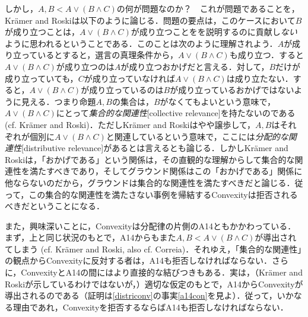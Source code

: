 \documentclass[twoside,14Q,uplatex,dvipdfmx]{jsarticle}
\theoremstyle{definition}
\begin{document}
しかし，$A, B<A\lor(B\land C)$の何が問題なのか？　これが問題であることを，Kr\"{a}mer and Roski\cite{KramerandRoski2015}は以下のように論じる．問題の要点は，このケースにおいて$B$が成り立つことは，$A\lor(B\land C)$が成り立つことをを説明するのに貢献し\emph{ない}ように思われるということである．このことは次のように理解されよう．$A$が成り立っているとすると，選言の真理条件から，$A\lor(B\land C)$も成り立つ．すると$A\lor(B\land C)$が成り立つのは$A$が成り立つおかげだと言える．対して，$B$だけが成り立っていても，$C$が成り立っていなければ$A\lor(B\land C)$は成り立たない．すると，$A\lor(B\land C)$が成り立っているのは$B$が成り立っているおかげではないように見える．つまり命題$A, B$の集合は，$B$がなくてもよいという意味で，$A\lor(B\land C)$にとって\emph{集合的な関連性}[collective relevance]を持たないのである (cf. Kr\"{a}mer and Roski\cite[p.65]{KramerandRoski2015})．ただしKr\"{a}mer and Roskiはやや譲歩して，$A, B$はそれぞれが個別に$A\lor(B\land C)$と関連しているという意味で，ここには\emph{分配的な関連性}[distributive relevance]があるとは言えるとも論じる．しかしKr\"{a}mer and Roskiは，「おかげである」という関係は，その直観的な理解からして集合的な関連性を満たすべきであり，そしてグラウンド関係はこの「おかげである」関係に他ならないのだから，グラウンドは集合的な関連性を満たすべきだと論じる．従って，この集合的な関連性を満たさない事例を帰結するConvexityは拒否されるべきだということになる．

また，興味深いことに，Convexityは分配律の片側のA14ともかかわっている．まず，上と同じ状況のもとで，A14からもまた$A, B<A\lor(B\land C)$が導出されてしまう (cf. Kr\"{a}mer and Roski\cite[pp.62--3]{KramerandRoski2015}, also cf. Correia\cite[pp.119-20]{Correia2016})．それゆえ，「集合的な関連性」の観点からConvexityに反対する者は，A14も拒否しなければならない．さらに，ConvexityとA14の間にはより直接的な結びつきもある．実は，（Kr\"{a}mer and Roski\cite{KramerandRoski2015}が示しているわけではないが，）適切な仮定のもとで，A14からConvexityが導出されるのである（証明は\ref{districonv}の事実\ref{a14con}を見よ）．従って，いかなる理由であれ，Convexityを拒否するならばA14も拒否しなければならない．
\end{document}

